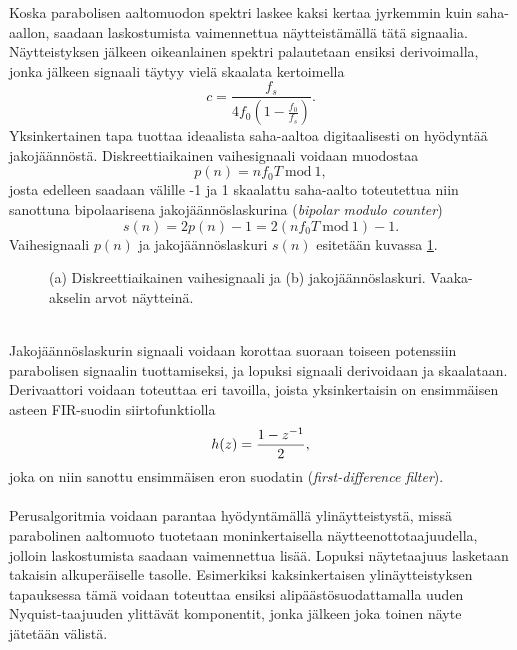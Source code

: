 \documentclass[finnish,12pt,a4paper,pdftex]{article} %
\begin{document}
\clearpage \noindent
Koska parabolisen aaltomuodon spektri laskee kaksi kertaa jyrkemmin kuin saha-aallon, saadaan laskostumista vaimennettua näytteistämällä tätä signaalia. Näytteistyksen jälkeen oikeanlainen spektri palautetaan ensiksi derivoimalla, jonka jälkeen signaali täytyy vielä skaalata kertoimella
\begin{equation}
c = \frac{f_s}{4f_0(1-\frac{f_0}{f_s})}.
\end{equation}
Yksinkertainen tapa tuottaa ideaalista saha-aaltoa digitaalisesti on hyödyntää jakojäännöstä. Diskreettiaikainen vaihesignaali voidaan muodostaa
\begin{equation}
p(n) = n f_0 T \ \text{mod} \ 1,
\end{equation}
josta edelleen saadaan välille -1 ja 1 skaalattu saha-aalto toteutettua niin sanottuna bipolaarisena jakojäännöslaskurina (\textit{bipolar modulo counter})
\begin{equation}
\label{eq:bmc} 
s(n) = 2 p(n) -1 = 2 (n f_0 T \ \text{mod} \ 1) -1.
\end{equation}
Vaihesignaali $p(n)$ ja jakojäännöslaskuri $s(n)$ esitetään kuvassa \ref{fig:dpw2}.
\vspace{2mm}
\begin{figure}[ht] 
\begin{center} 	
\caption{(a) Diskreettiaikainen vaihesignaali ja (b) jakojäännöslaskuri. Vaaka-akselin arvot näytteinä.}
\label{fig:dpw2}
\end{center}
\end{figure} \\
Jakojäännöslaskurin signaali voidaan korottaa suoraan toiseen potenssiin parabolisen signaalin tuottamiseksi, ja lopuksi signaali derivoidaan ja skaalataan. Derivaattori voidaan toteuttaa eri tavoilla, joista yksinkertaisin on ensimmäisen asteen FIR-suodin siirtofunktiolla
\begin{equation}
h(z) = \frac{1-z^{-1}}{2}, \vspace{1mm}
\end{equation}
joka on niin sanottu ensimmäisen eron suodatin (\textit{first-difference filter}). \cite{Valimaki2006, Valimaki2005} \\\\
Perusalgoritmia voidaan parantaa hyödyntämällä ylinäytteistystä, missä parabolinen aaltomuoto tuotetaan moninkertaisella näytteenottotaajuudella, jolloin laskostumista saadaan vaimennettua lisää. Lopuksi näytetaajuus lasketaan takaisin alkuperäiselle tasolle. Esimerkiksi kaksinkertaisen ylinäytteistyksen tapauksessa tämä voidaan toteuttaa ensiksi alipäästösuodattamalla uuden Nyquist-taajuuden ylittävät komponentit, jonka jälkeen joka toinen näyte jätetään välistä. \cite{Valimaki2005} \\
\end{document}
